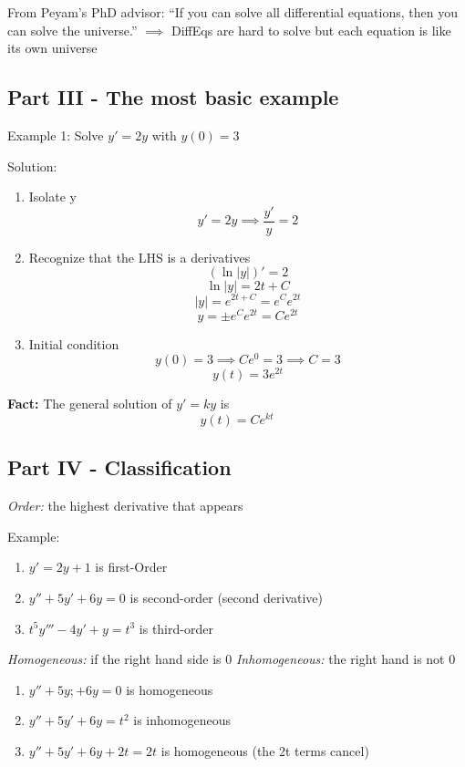 \documentclass[12pt]{article}
\begin{document}
From Peyam's PhD advisor:
“If you can solve all differential equations, then you can solve the universe.” $\implies$ DiffEqs are hard to solve but each equation is like its own universe 

\subsection*{Part III - The most basic example}
Example 1: Solve $y' = 2y$ with $y(0) = 3$

Solution:
\begin{enumerate}
    \item Isolate y
    \[y' = 2y \implies \frac{y'}{y} = 2\]

    \item Recognize that the LHS is a derivatives
    \[(\ln |y|)' = 2\]
    \[\ln |y| = 2t + C\]
    \[|y| = e^{2t + C} = e^Ce^{2t}\]
    \[y = \pm e^C e^{2t} = Ce^{2t}\]

    \item Initial condition
    \[y(0) = 3 \implies Ce^0 = 3 \implies C = 3\]
    \[\boxed{y(t) = 3e^{2t}}\]
\end{enumerate}

\textbf{Fact:}
The general solution of $y' = ky$ is 
\[\boxed{y(t) = Ce^{kt}}\]

\subsection*{Part IV - Classification}
\emph{Order:} the highest derivative that appears

Example: 
\begin{enumerate}
    \item $y' = 2y + 1$ is first-Order
    \item $y'' + 5y'+ 6y = 0$ is second-order (second derivative)
    \item $t^5 y''' - 4y' + y = t^3$ is third-order
\end{enumerate}

\emph{Homogeneous:} if the right hand side is 0
\emph{Inhomogeneous:} the right hand is not 0
\begin{enumerate}
    \item $y'' + 5y; + 6y = 0$ is homogeneous
    \item $y'' + 5y' + 6y = t^2$ is inhomogeneous
    \item $y'' + 5y' + 6y + 2t = 2t$ is homogeneous (the 2t terms cancel)
\end{enumerate}
\end{document}
